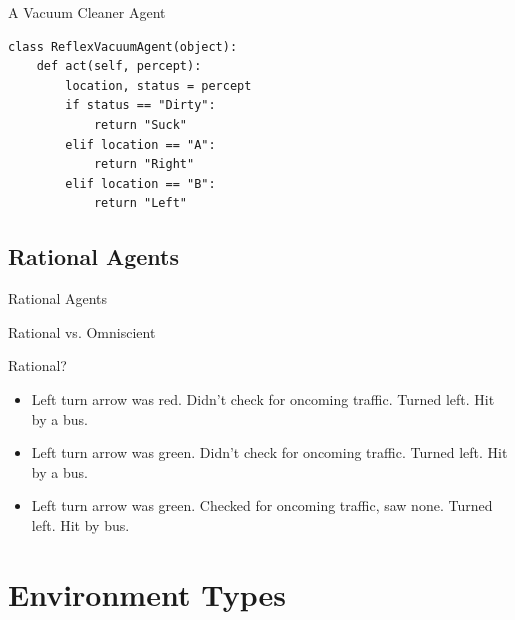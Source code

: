 \documentclass[14pt]{beamer}
\begin{document}
\begin{frame}[fragile]{A Vacuum Cleaner Agent}
\begin{lstlisting}
class ReflexVacuumAgent(object):
    def act(self, percept):
        location, status = percept
        if status == "Dirty":
            return "Suck"
        elif location == "A":
            return "Right"
        elif location == "B":
            return "Left"
\end{lstlisting}
\end{frame}

\subsection{Rational Agents}

\begin{frame}{Rational Agents}
\end{frame}

\begin{frame}{Rational vs. Omniscient}
\begin{block}{Rational?}
\begin{itemize}
\item Left turn arrow was red. Didn't check for oncoming traffic. Turned left. Hit by a bus.
\pause
\item Left turn arrow was green. Didn't check for oncoming traffic. Turned left. Hit by a bus.
\pause
\item Left turn arrow was green. Checked for oncoming traffic, saw none. Turned left. Hit by bus.
\end{itemize}
\end{block}
\end{frame}

\section{Environment Types}
\end{document}

